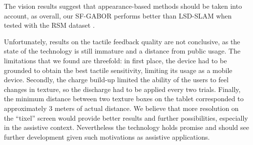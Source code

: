 The vision results suggest that appearance-based methods should be taken into account, as overall, our SF-GABOR performs better than LSD-SLAM when tested with the RSM dataset \citep{Rivera-RubioRSM}.

Unfortunately, results on the tactile feedback quality are not conclusive, as the state of the technology is still immature and a distance from public usage. The limitations that we found are threefold: in first place, the device had to be grounded to obtain the best tactile sensitivity, limiting its usage as a mobile device. Secondly, the charge build-up limited the ability of the users to feel changes in texture, so the discharge had to be applied every two trials. Finally, the minimum distance between two texture boxes on the tablet corresponded to approximately 3 meters of actual distance. We believe that more resolution on the ``tixel'' screen would provide better results and further possibilities, especially in the assistive context. Nevertheless the technology holds promise and should see further development given such motivations as assistive applications.
